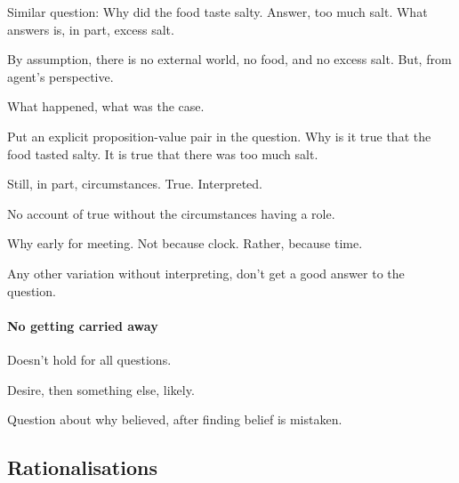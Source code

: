 \nocite{Smith:1988aa,Smith:1987tz}

\begin{note}
  Similar question:
  Why did the food taste salty.
  Answer, too much salt.
  What answers is, in part, excess salt.

  By assumption, there is no external world, no food, and no excess salt.
  But, from agent's perspective.

  What happened, what was the case.
\end{note}

\begin{note}
  Put an explicit proposition-value pair in the question.
  Why is it true that the food tasted salty.
  It is true that there was too much salt.

  Still, in part, circumstances.
  True.
  Interpreted.

  No account of true without the circumstances having a role.
\end{note}

\begin{note}
  Why early for meeting.
  Not because clock.
  Rather, because time.
\end{note}


\begin{note}
  Any other variation without interpreting, don't get a good answer to the question.
\end{note}

\paragraph{No getting carried away}

\begin{note}
  Doesn't hold for all questions.
\end{note}

\begin{note}
  Desire, then something else, likely.
\end{note}

\begin{note}
  Question about why believed, after finding belief is mistaken.
\end{note}

\subsection{Rationalisations}
\label{sec:rationalisations}

